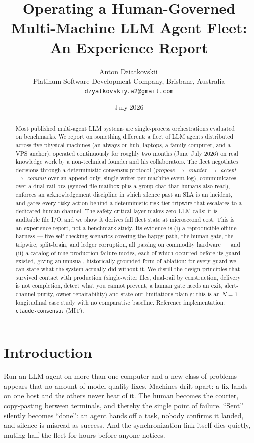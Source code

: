 \documentclass[11pt]{article}
\title{Operating a Human-Governed Multi-Machine LLM Agent Fleet:\\ An Experience Report}
\author{Anton Dziatkovskii\,\orcidlink{0000-0001-7408-3054}\\
\small Platinum Software Development Company, Brisbane, Australia\\
\small \texttt{dzyatkovskiy.a2@gmail.com}}
\date{July 2026}
\begin{document}
\maketitle

\begin{abstract}
Most published multi-agent LLM systems are single-process orchestrations evaluated on benchmarks. We report on something different: a fleet of LLM agents distributed across five physical machines (an always-on hub, laptops, a family computer, and a VPS anchor), operated continuously for roughly two months (June--July 2026) on real knowledge work by a non-technical founder and his collaborators. The fleet negotiates decisions through a deterministic consensus protocol (\emph{propose $\to$ counter $\to$ accept $\to$ commit} over an append-only, single-writer-per-machine event log), communicates over a dual-rail bus (synced file mailbox plus a group chat that humans also read), enforces an acknowledgement discipline in which silence past an SLA is an incident, and gates every risky action behind a deterministic risk-tier tripwire that escalates to a dedicated human channel. The safety-critical layer makes zero LLM calls: it is auditable file I/O, and we show it derives full fleet state at microsecond cost. This is an experience report, not a benchmark study. Its evidence is (i) a reproducible offline harness --- five self-checking scenarios covering the happy path, the human gate, the tripwire, split-brain, and ledger corruption, all passing on commodity hardware --- and (ii) a catalog of nine production failure modes, each of which occurred before its guard existed, giving an unusual, historically grounded form of ablation: for every guard we can state what the system actually did without it. We distill the design principles that survived contact with production (single-writer files, dual-rail by construction, delivery is not completion, detect what you cannot prevent, a human gate needs an exit, alert-channel purity, owner-repairability) and state our limitations plainly: this is an $N{=}1$ longitudinal case study with no comparative baseline. Reference implementation: \texttt{claude-consensus} (MIT).
\end{abstract}

\section{Introduction}
Run an LLM agent on more than one computer and a new class of problems appears that no amount of model quality fixes. Machines drift apart: a fix lands on one host and the others never hear of it. The human becomes the courier, copy-pasting between terminals, and thereby the single point of failure. ``Sent'' silently becomes ``done'': an agent hands off a task, nobody confirms it landed, and silence is misread as success. And the synchronization link itself dies quietly, muting half the fleet for hours before anyone notices.
\end{document}
